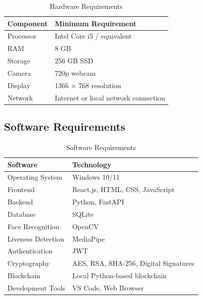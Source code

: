 \documentclass[12pt]{report}
\begin{document}
	\begin{table}[h!]
		\centering
		\renewcommand{\arraystretch}{1.6}
		\renewcommand{\arraystretch}{1.6}
		\caption{Hardware Requirements}
		\vspace{0.2cm}
		\label{tab:hardware_req}
		\begin{tabular}{|p{5cm}|p{9.5cm}|}
			\hline
			\textbf{Component} & \textbf{Minimum Requirement} \\ \hline
			Processor & Intel Core i5 / equivalent \\ \hline
			RAM & 8 GB \\ \hline
			Storage & 256 GB SSD \\ \hline
			Camera & 720p webcam \\ \hline
			Display & 1366 $\times$ 768 resolution \\ \hline
			Network & Internet or local network connection \\ \hline
		\end{tabular}
	\end{table}
	\newpage
	\subsection{Software Requirements}
	\begin{table}[h!]
		\centering
		\renewcommand{\arraystretch}{1.6}
		\renewcommand{\arraystretch}{1.6}
		\caption{Software Requirements}
		\vspace{0.2cm}
		\label{tab:software_req}
		\begin{tabular}{|p{5cm}|p{9.5cm}|}
			\hline
			\textbf{Software} & \textbf{Technology} \\ \hline
			Operating System & Windows 10/11 \\ \hline
			Frontend & React.js, HTML, CSS, JavaScript \\ \hline
			Backend & Python, FastAPI \\ \hline
			Database & SQLite \\ \hline
			Face Recognition & OpenCV \\ \hline
			Liveness Detection & MediaPipe \\ \hline
			Authentication & JWT \\ \hline
			Cryptography & AES, RSA, SHA-256, Digital Signatures \\ \hline
			Blockchain & Local Python-based blockchain \\ \hline
			Development Tools & VS Code, Web Browser \\ \hline
		\end{tabular}
	\end{table}
	
\end{document}
